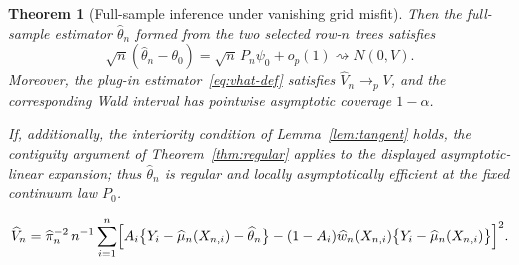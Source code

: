 \documentclass[11pt]{article}
\theoremstyle{plain}
\newtheorem{theorem}{Theorem}[section]
\theoremstyle{definition}
\theoremstyle{remark}
\begin{document}
\begin{theorem}[Full-sample inference under vanishing grid misfit]
Then the full-sample estimator $\widehat\theta_n$ formed from the two
selected row-$n$ trees satisfies
\[
 \sqrt n(\widehat\theta_n-\theta_0)
 =\sqrt n\,P_n\psi_0+o_p(1)
 \rightsquigarrow N(0,V).
\]
Moreover, the plug-in estimator~\eqref{eq:vhat-def} satisfies
$\widehat V_n\to_pV$, and the corresponding Wald interval has pointwise
asymptotic coverage $1-\alpha$.

If, additionally, the interiority condition of Lemma~\ref{lem:tangent}
holds, the contiguity argument of Theorem~\ref{thm:regular} applies to the
displayed asymptotic-linear expansion; thus $\widehat\theta_n$ is regular
and locally asymptotically efficient at the fixed continuum law $P_0$.
\end{theorem}

\begin{equation}\label{eq:vhat-def}
  \widehat V_n
  =\widehat\pi_n^{-2}\,n^{-1}\sum_{i=1}^n
  \Bigl[A_i\bigl\{Y_i-\widehat\mu_n(X_{n,i})-\widehat\theta_n\bigr\}
   -(1-A_i)\widehat w_n(X_{n,i})\bigl\{Y_i-\widehat\mu_n(X_{n,i})\bigr\}\Bigr]^2 .
\end{equation}
\end{document}
